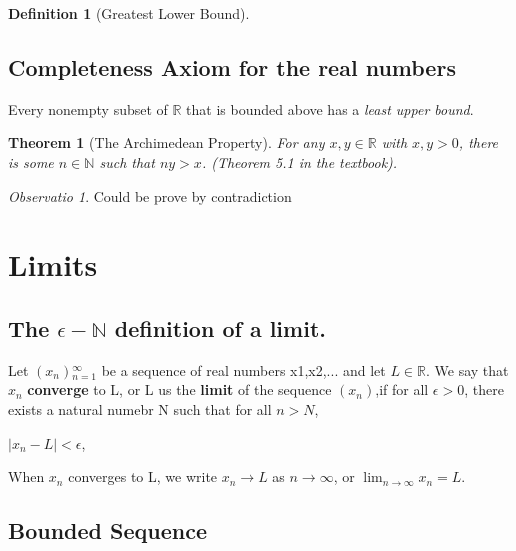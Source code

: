 \documentclass{article}
\newtheorem{theorem}{Theorem}[section]
\theoremstyle{definition}
\newtheorem{definition}{Definition}[section]
\theoremstyle{definition}
\theoremstyle{remark}
\newtheorem{remark}{Observatio}[section]
\begin{document}
\begin{definition}[Greatest Lower Bound]
\end{definition}

\subsection{Completeness Axiom for the real numbers}
Every nonempty subset of $\mathbb{R}$ that is bounded above has a \emph{least upper bound}.\\

\begin{theorem}[The Archimedean Property]
For any $x,y\in \mathbb{R}$ with $x,y>0$, there is some $n\in \mathbb{N}$ such that $ny>x$. (Theorem 5.1 in the textbook).
\end{theorem}
\begin{remark}
Could be prove by contradiction
\end{remark}

\newpage

\section {Limits}

\subsection{The $\epsilon-\mathbb{N}$ definition of a limit.}
Let ${(x_{n})}{_{n=1}^{\infty}}$ be a sequence of real numbers x1,x2,... and let $L\in \mathbb{R}$. We say that $x_{n}$ \textbf{converge} to L, or L us the \textbf{limit} of the sequence $(x_{n})$,if for all $\epsilon > 0$, there exists a natural numebr N such that for all $n>N$,\\

\begin{center}

$|x_{n}-L| < \epsilon$,\\

\end{center}


When $x_{n}$ converges to L, we write $x_{n} \rightarrow L$ as $n\rightarrow \infty$, or $\lim_{n\rightarrow \infty}x_{n}=L$.

\subsection{Bounded Sequence}
\end{document}

